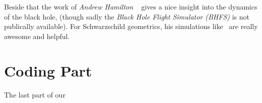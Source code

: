 Beside that the work of \emph{Andrew Hamilton} ~\cite{hamilton_insidebh} gives a nice insight into the dynamics of the black hole, (though sadly the \emph{Black Hole Flight Simulator (BHFS)} is not publically available).
For Schwarzschild geometrics, his simulations like~\cite{hamilton_schw} are really awesome and helpful. 

\section{Coding Part}\label{sec:code}

The last part of our 
